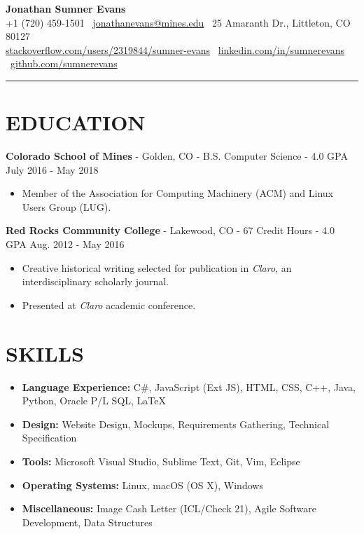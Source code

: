 \documentclass[10.5pt,letterpaper]{article}
\begin{document}
\begin{center}
    \huge\textbf{Jonathan Sumner Evans}\\
    \vspace{3pt}
    \small +1 (720) 459-1501
    \textbar\ \href{mailto:jonathanevans@mines.edu}{jonathanevans@mines.edu}
    \textbar\ 25 Amaranth Dr., Littleton, CO 80127 \\
    \href{http://stackoverflow.com/users/2319844/sumner-evans}{stackoverflow.com/users/2319844/sumner-evans}
    \textbar\ \href{https://www.linkedin.com/in/sumnerevans}{linkedin.com/in/sumnerevans}
    \textbar\ \href{https://github.com/sumnerevans}{github.com/sumnerevans}
    \rule{\textwidth}{0.5pt}
\end{center}

\section*{EDUCATION}
\textbf{Colorado School of Mines} - Golden, CO - B.S. Computer Science - 4.0 GPA \hfill
July 2016 - May 2018
\begin{itemize}
    \item Member of the Association for Computing Machinery (ACM) and Linux Users Group (LUG).
\end{itemize}

\vspace{4pt}
\textbf{Red Rocks Community College} - Lakewood, CO - 67 Credit Hours - 4.0 GPA \hfill
Aug. 2012 - May 2016
\begin{itemize}
    \item Creative historical writing selected for publication in \textit{Claro}, an
        interdisciplinary scholarly journal.
    \item Presented at \textit{Claro} academic conference.
\end{itemize}

\section*{SKILLS}
{
    \renewcommand\labelitemi{}
    \renewcommand\leftmargini{0pt}
    \begin{itemize}
        \item \textbf{Language Experience:} C\#, JavaScript (Ext JS), HTML, CSS, C++,
            Java, Python, Oracle P/L SQL, \LaTeX
        \item \textbf{Design:} Website Design, Mockups, Requirements Gathering, Technical
            Specification
        \item \textbf{Tools:} Microsoft Visual Studio, Sublime Text, Git, Vim, Eclipse
        \item \textbf{Operating Systems:} Linux, macOS (OS X), Windows
        \item \textbf{Miscellaneous:} Image Cash Letter (ICL/Check 21), Agile Software Development,
            Data Structures
    \end{itemize}
}
\end{document}
